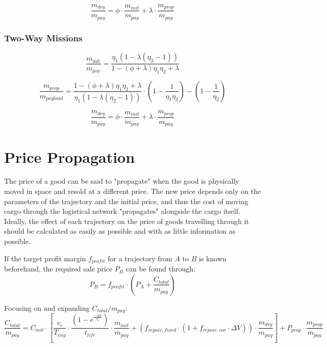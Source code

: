 \documentclass{article}
\begin{document}
\begin{equation}
\frac{m_{dry}}{m_{pay}} = \phi \cdot \frac{m_{init}}{m_{pay}}+\lambda \cdot  \frac{m_{prop}}{m_{pay}}
\end{equation}

\subsubsection{Two-Way Missions}
\begin{equation}
\frac{m_{\text {init}}}{m_{\text {pay}}}=\frac{\eta_{1}\left(1-\lambda\left(\eta_{2}-1\right)\right)}{1-(\phi+\lambda) \eta_{1} \eta_{2}+\lambda}
\end{equation}

\begin{equation}
\frac{m_{prop}}{m_{payload}} = \frac{1-(\phi+\lambda) \eta_{1} \eta_{2}+\lambda}{\eta_{1}\left(1-\lambda\left(\eta_{2}-1\right)\right)} \cdot \left(1- \frac{1}{\eta_1 \eta_2}\right) - \left(1-\frac{1}{\eta_2}\right)
\end{equation}

\begin{equation}
\frac{m_{dry}}{m_{pay}} = \phi \cdot \frac{m_{init}}{m_{pay}}+\lambda \cdot  \frac{m_{prop}}{m_{pay}}
\end{equation}

\section{Price Propagation}
The price of a good can be said to "propagate" when the good is physically moved in space and resold at a different price. The new price depends only on the parameters of the trajectory and the initial price, and thus the cost of moving cargo through the logistical network "propagates" alongside the cargo itself. Ideally, the effect of each trajectory on the price of goods travelling through it should be calculated as easily as possible and with as little information as possible.

If the target profit margin $f_{profit}$ for a trajectory from $A$ to $B$ is known beforehand, the required sale price $P_B$ can be found through:
\begin{equation}
P_{B} = f_{profit} \cdot \left(P_A + \frac{C_{total}}{m_{pay}}\right)
\end{equation}

Focusing on and expanding $C_{total}/m_{pay}$:
\begin{equation}
\frac{C_{total}}{m_{pay}} =C_{init} \cdot \left[ \frac{v_e}{T_{eng}} \cdot \frac{(1-e^{\frac{ - \Delta V}{v_e}})}{t_{life}} \cdot \frac{m_{init}}{m_{pay}} + (f_{repair, fixed} \cdot (1 + f_{repair, var} \cdot \Delta V ) ) \cdot \frac{m_{dry}}{m_{pay}} \right] + P_{prop} \cdot \frac{m_{prop}}{m_{pay}}
\end{equation}
\end{document}
